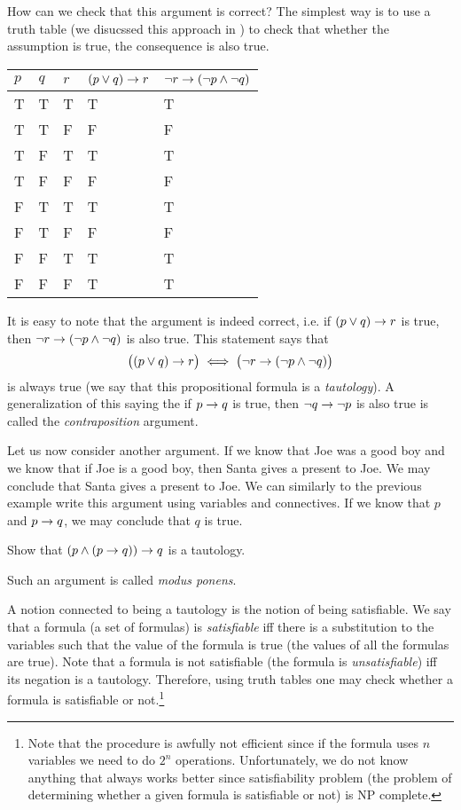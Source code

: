 How can we check that this argument is correct? The simplest way is to use a
truth table (we disucssed this approach in ) to check
that whether the assumption is true, the consequence is also true.
\begin{center}
    \begin{tabular}{l l l l l}
        \toprule
        $p$ & $q$ & $r$ & $(p \lor q) \rightarrow r$ &
        $\lnot r \rightarrow (\lnot p \land \lnot q)$ \\
        \midrule
        T & T & T & T & T \\
        T & T & F & F & F \\
        T & F & T & T & T \\
        T & F & F & F & F \\
        F & T & T & T & T \\
        F & T & F & F & F \\
        F & F & T & T & T \\
        F & F & F & T & T \\
        \bottomrule
    \end{tabular}
\end{center}
It is easy to note that the argument is indeed correct, i.e.
if $(p \lor q) \rightarrow r$ is true, then
$\lnot r \rightarrow (\lnot p \land \lnot q)$ is also true.
This statement says that
\[
  \bigl((p \lor q) \rightarrow r\bigr) \iff
  \bigl(\lnot r \rightarrow (\lnot p \land \lnot q) \bigr)
\]
is always true (we say that this propositional formula is a
\emph{tautology}). A generalization of this saying the if $p \rightarrow q$ is
true, then $\lnot q \rightarrow \lnot p$ is also true is called the
\emph{contraposition} argument.

Let us now consider another argument. If we know that Joe was a good boy and we
know that if Joe is a good boy, then Santa gives a present to Joe. We may
conclude that Santa gives a present to Joe. We can similarly to the previous
example write this argument using variables and connectives.
If we know that $p$ and $p \rightarrow q$, we may conclude that $q$ is true.
\begin{exercise}
  Show that $(p \land (p \rightarrow q)) \rightarrow q$ is a tautology.
\end{exercise}
Such an argument is called \emph{modus ponens}.

A notion connected to being a tautology is the notion of being satisfiable.
We say that a formula (a set of formulas) is \emph{satisfiable} iff there
is a substitution to the variables such that the value of the formula is true
(the values of all the formulas are true). Note that a formula is not
satisfiable (the formula is \emph{unsatisfiable}) iff its negation is
a tautology. Therefore, using truth tables one may check whether a formula
is satisfiable or not.\footnote{%
  Note that the procedure is awfully not efficient since if the formula
  uses $n$ variables we need to do $2^n$ operations. Unfortunately,
  we do not know anything that always works better since
  satisfiability problem (the problem of determining whether a given formula is
  satisfiable or not) is NP complete.
}

